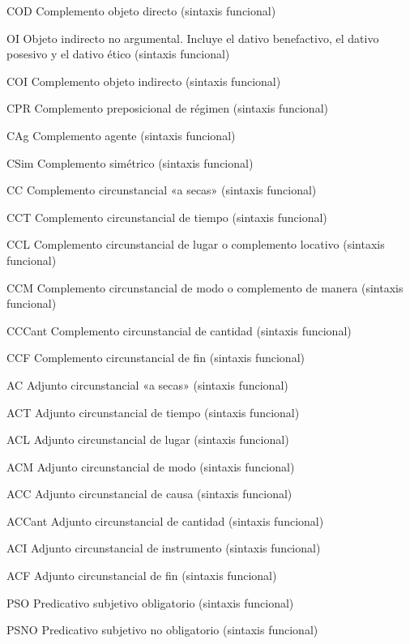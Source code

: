 \begin{siglario}
  \item[COD] Complemento objeto directo (sintaxis funcional)
  \item[OI] Objeto indirecto no argumental. Incluye el dativo benefactivo, el
        dativo posesivo y el dativo ético (sintaxis funcional)
  \item[COI] Complemento objeto indirecto (sintaxis funcional)
  \item[CPR] Complemento preposicional de régimen (sintaxis funcional)
  \item[CAg] Complemento agente (sintaxis funcional)
  \item[CSim] Complemento simétrico (sintaxis funcional)
  \item[CC] Complemento circunstancial «a secas» (sintaxis funcional)
  \item[CCT] Complemento circunstancial de tiempo (sintaxis funcional)
  \item[CCL] Complemento circunstancial de lugar o complemento locativo
        (sintaxis funcional)
  \item[CCM] Complemento circunstancial de modo o complemento de manera
        (sintaxis funcional)
  \item[CCCant] Complemento circunstancial de cantidad (sintaxis funcional)
  \item[CCF] Complemento circunstancial de fin (sintaxis funcional)
  \item[AC] Adjunto circunstancial «a secas» (sintaxis funcional)
  \item[ACT] Adjunto circunstancial de tiempo (sintaxis funcional)
  \item[ACL] Adjunto circunstancial de lugar (sintaxis funcional)
  \item[ACM] Adjunto circunstancial de modo (sintaxis funcional)
  \item[ACC] Adjunto circunstancial de causa (sintaxis funcional)
  \item[ACCant] Adjunto circunstancial de cantidad (sintaxis funcional)
  \item[ACI] Adjunto circunstancial de instrumento (sintaxis funcional)
  \item[ACF] Adjunto circunstancial de fin (sintaxis funcional)
  \item[PSO] Predicativo subjetivo obligatorio (sintaxis funcional)
  \item[PSNO] Predicativo subjetivo no obligatorio (sintaxis funcional)

\end{siglario}
